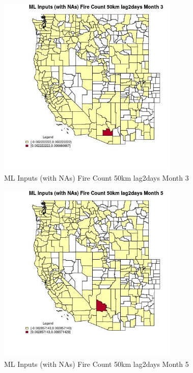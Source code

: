 \clearpage 

\begin{figure} 
\centering  
\includegraphics[width=0.77\textwidth]{Code_Outputs/Report_ML_input_PM25_Step4_part_e_de_duplicated_aves_compiled_2019-05-20wNAs_CountyFire_Count_50km_lag2daysmedianMonth3.jpg} 
\caption{\label{fig:Report_ML_input_PM25_Step4_part_e_de_duplicated_aves_compiled_2019-05-20wNAsCountyFire_Count_50km_lag2daysmedianMonth3}ML Inputs (with NAs) Fire Count 50km lag2days Month 3} 
\end{figure} 
 

\begin{figure} 
\centering  
\includegraphics[width=0.77\textwidth]{Code_Outputs/Report_ML_input_PM25_Step4_part_e_de_duplicated_aves_compiled_2019-05-20wNAs_CountyFire_Count_50km_lag2daysmedianMonth5.jpg} 
\caption{\label{fig:Report_ML_input_PM25_Step4_part_e_de_duplicated_aves_compiled_2019-05-20wNAsCountyFire_Count_50km_lag2daysmedianMonth5}ML Inputs (with NAs) Fire Count 50km lag2days Month 5} 
\end{figure} 
 

